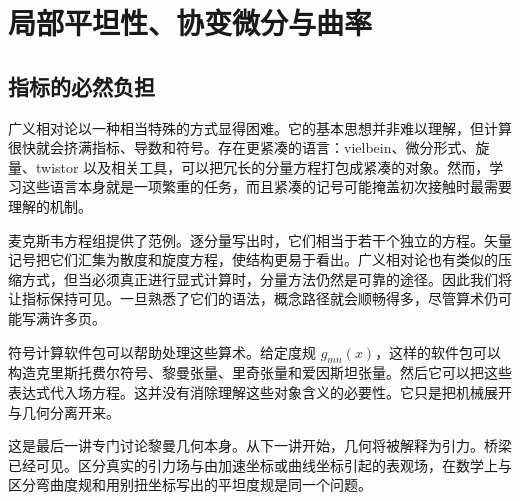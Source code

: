 \chapter{局部平坦性、协变微分与曲率}


\section{指标的必然负担}

广义相对论以一种相当特殊的方式显得困难。它的基本思想并非难以理解，但计算很快就会挤满指标、导数和符号。存在更紧凑的语言：vielbein、微分形式、旋量、twistor 以及相关工具，可以把冗长的分量方程打包成紧凑的对象。然而，学习这些语言本身就是一项繁重的任务，而且紧凑的记号可能掩盖初次接触时最需要理解的机制。

麦克斯韦方程组提供了范例。逐分量写出时，它们相当于若干个独立的方程。矢量记号把它们汇集为散度和旋度方程，使结构更易于看出。广义相对论也有类似的压缩方式，但当必须真正进行显式计算时，分量方法仍然是可靠的途径。因此我们将让指标保持可见。一旦熟悉了它们的语法，概念路径就会顺畅得多，尽管算术仍可能写满许多页。

符号计算软件包可以帮助处理这些算术。给定度规 \(g_{mn}(x)\)，这样的软件包可以构造克里斯托费尔符号、黎曼张量、里奇张量和爱因斯坦张量。然后它可以把这些表达式代入场方程。这并没有消除理解这些对象含义的必要性。它只是把机械展开与几何分离开来。

\begin{classroomqa}
\end{classroomqa}

这是最后一讲专门讨论黎曼几何本身。从下一讲开始，几何将被解释为引力。桥梁已经可见。区分真实的引力场与由加速坐标或曲线坐标引起的表观场，在数学上与区分弯曲度规和用别扭坐标写出的平坦度规是同一个问题。

